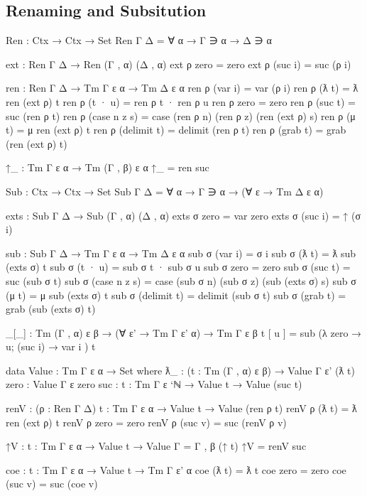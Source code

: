 \subsection{Renaming and Subsitution}

\begin{code}
Ren : Ctx → Ctx → Set
Ren Γ Δ = ∀ {α} → Γ ∋ α → Δ ∋ α

ext : Ren Γ Δ → Ren (Γ , α) (Δ , α)
ext ρ zero = zero
ext ρ (suc i) = suc (ρ i)

ren : Ren Γ Δ → Tm Γ ε α → Tm Δ ε α
ren ρ (var i) = var (ρ i)
ren ρ (ƛ t) = ƛ ren (ext ρ) t
ren ρ (t · u) = ren ρ t · ren ρ u
ren ρ zero = zero
ren ρ (suc t) = suc (ren ρ t)
ren ρ (case n z s) = case (ren ρ n) (ren ρ z) (ren (ext ρ) s)
ren ρ (μ t) = μ ren (ext ρ) t
ren ρ (delimit t) = delimit (ren ρ t)
ren ρ (grab t) = grab (ren (ext ρ) t)

↑_ : Tm Γ ε α → Tm (Γ , β) ε α
↑_ = ren suc
\end{code}

\begin{code}
Sub : Ctx → Ctx → Set
Sub Γ Δ = ∀ {α} → Γ ∋ α → (∀ {ε} → Tm Δ ε α)

exts : Sub Γ Δ → Sub (Γ , α) (Δ , α)
exts σ zero = var zero
exts σ (suc i) = ↑ (σ i)

sub : Sub Γ Δ → Tm Γ ε α → Tm Δ ε α
sub σ (var i) = σ i
sub σ (ƛ t) = ƛ sub (exts σ) t
sub σ (t · u) = sub σ t · sub σ u
sub σ zero = zero
sub σ (suc t) = suc (sub σ t)
sub σ (case n z s) = case (sub σ n) (sub σ z) (sub (exts σ) s)
sub σ (μ t) = μ sub (exts σ) t
sub σ (delimit t) = delimit (sub σ t)
sub σ (grab t) = grab (sub (exts σ) t)

_[_] : Tm (Γ , α) ε β → (∀ {ε'} → Tm Γ ε' α) → Tm Γ ε β
t [ u ] = sub (λ { zero → u; (suc i) → var i }) t
\end{code}

\begin{code}
data Value : Tm Γ ε α → Set where
  ƛ_ : (t : Tm (Γ , α) ε β) → Value {Γ} {ε'} (ƛ t)
  zero : Value {Γ} {ε} zero
  suc : {t : Tm Γ ε `ℕ} → Value t → Value (suc t)

renV : (ρ : Ren Γ Δ) {t : Tm Γ ε α} → Value t → Value (ren ρ t)
renV ρ (ƛ t) = ƛ ren (ext ρ) t
renV ρ zero = zero
renV ρ (suc v) = suc (renV ρ v)

↑V : {t : Tm Γ ε α} → Value t → Value {Γ = Γ , β} (↑ t)
↑V = renV suc

coe : {t : Tm Γ ε α} → Value t → Tm Γ ε' α
coe (ƛ t) = ƛ t
coe zero = zero
coe (suc v) = suc (coe v)
\end{code}

